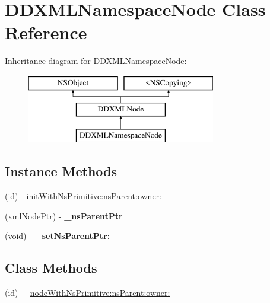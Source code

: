 \hypertarget{class_d_d_x_m_l_namespace_node}{}\section{D\+D\+X\+M\+L\+Namespace\+Node Class Reference}
\label{class_d_d_x_m_l_namespace_node}
Inheritance diagram for D\+D\+X\+M\+L\+Namespace\+Node\+:\begin{figure}[H]
\begin{center}
\leavevmode
\includegraphics[height=3.000000cm]{class_d_d_x_m_l_namespace_node}
\end{center}
\end{figure}
\subsection*{Instance Methods}
\begin{DoxyCompactItemize}
\item 
(id) -\/ \hyperlink{class_d_d_x_m_l_namespace_node_a5d5dd8c273e97410a2a0cc240ac5d122}{init\+With\+Ns\+Primitive\+:ns\+Parent\+:owner\+:}
\item 
\hypertarget{class_d_d_x_m_l_namespace_node_ab84f395d63c7a20e07dfe2889794f427}{}(xml\+Node\+Ptr) -\/ {\bfseries \+\_\+ns\+Parent\+Ptr}\label{class_d_d_x_m_l_namespace_node_ab84f395d63c7a20e07dfe2889794f427}

\item 
\hypertarget{class_d_d_x_m_l_namespace_node_a3db0f0ddb812a3f522fae177610d0848}{}(void) -\/ {\bfseries \+\_\+set\+Ns\+Parent\+Ptr\+:}\label{class_d_d_x_m_l_namespace_node_a3db0f0ddb812a3f522fae177610d0848}

\end{DoxyCompactItemize}
\subsection*{Class Methods}
\begin{DoxyCompactItemize}
\item 
(id) + \hyperlink{class_d_d_x_m_l_namespace_node_aadc45f4564f4c72e37224d9a331ae622}{node\+With\+Ns\+Primitive\+:ns\+Parent\+:owner\+:}
\end{DoxyCompactItemize}

